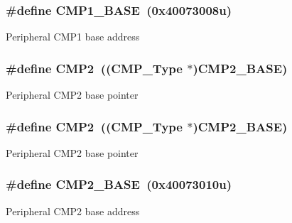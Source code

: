 \subsubsection[{\texorpdfstring{C\+M\+P1\+\_\+\+B\+A\+SE}{CMP1_BASE}}]{\setlength{\rightskip}{0pt plus 5cm}\#define C\+M\+P1\+\_\+\+B\+A\+SE~(0x40073008u)}\hypertarget{group__CMP__Peripheral__Access__Layer_ga890dc341ab8c2c9f71f9840cda07b9cb}{}\label{group__CMP__Peripheral__Access__Layer_ga890dc341ab8c2c9f71f9840cda07b9cb}
Peripheral C\+M\+P1 base address 
\subsubsection[{\texorpdfstring{C\+M\+P2}{CMP2}}]{\setlength{\rightskip}{0pt plus 5cm}\#define C\+M\+P2~(({\bf C\+M\+P\+\_\+\+Type} $\ast$){\bf C\+M\+P2\+\_\+\+B\+A\+SE})}\hypertarget{group__CMP__Peripheral__Access__Layer_ga023ff9e161b651f7f47e0457fe0c1fcb}{}\label{group__CMP__Peripheral__Access__Layer_ga023ff9e161b651f7f47e0457fe0c1fcb}
Peripheral C\+M\+P2 base pointer 
\subsubsection[{\texorpdfstring{C\+M\+P2}{CMP2}}]{\setlength{\rightskip}{0pt plus 5cm}\#define C\+M\+P2~(({\bf C\+M\+P\+\_\+\+Type} $\ast$){\bf C\+M\+P2\+\_\+\+B\+A\+SE})}\hypertarget{group__CMP__Peripheral__Access__Layer_ga023ff9e161b651f7f47e0457fe0c1fcb}{}\label{group__CMP__Peripheral__Access__Layer_ga023ff9e161b651f7f47e0457fe0c1fcb}
Peripheral C\+M\+P2 base pointer 
\subsubsection[{\texorpdfstring{C\+M\+P2\+\_\+\+B\+A\+SE}{CMP2_BASE}}]{\setlength{\rightskip}{0pt plus 5cm}\#define C\+M\+P2\+\_\+\+B\+A\+SE~(0x40073010u)}\hypertarget{group__CMP__Peripheral__Access__Layer_ga7e986bf6335f75207120a0ee5b84d1c6}{}\label{group__CMP__Peripheral__Access__Layer_ga7e986bf6335f75207120a0ee5b84d1c6}
Peripheral C\+M\+P2 base address 
